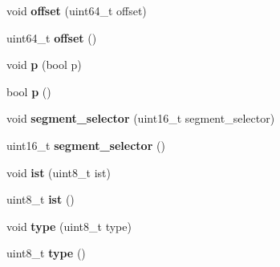 \begin{DoxyCompactItemize}
\item 
\hypertarget{classintel64__idt__entry_a64d4c35b617950088c2abad303904d0e}{}void {\bfseries offset} (uint64\+\_\+t offset)\label{classintel64__idt__entry_a64d4c35b617950088c2abad303904d0e}

\item 
\hypertarget{classintel64__idt__entry_afb87c81dc48ca3181df4e3cc02060582}{}uint64\+\_\+t {\bfseries offset} ()\label{classintel64__idt__entry_afb87c81dc48ca3181df4e3cc02060582}

\item 
\hypertarget{classintel64__idt__entry_a4ac5fe1536073c47a1f6250c8e3c76dc}{}void {\bfseries p} (bool p)\label{classintel64__idt__entry_a4ac5fe1536073c47a1f6250c8e3c76dc}

\item 
\hypertarget{classintel64__idt__entry_af1667a52578cedb9579e275dfa99e99b}{}bool {\bfseries p} ()\label{classintel64__idt__entry_af1667a52578cedb9579e275dfa99e99b}

\item 
\hypertarget{classintel64__idt__entry_ac0d1aa71414d543e8df0e2bdcfffe82e}{}void {\bfseries segment\+\_\+selector} (uint16\+\_\+t segment\+\_\+selector)\label{classintel64__idt__entry_ac0d1aa71414d543e8df0e2bdcfffe82e}

\item 
\hypertarget{classintel64__idt__entry_a979a444a42eae4301d1f777612061b96}{}uint16\+\_\+t {\bfseries segment\+\_\+selector} ()\label{classintel64__idt__entry_a979a444a42eae4301d1f777612061b96}

\item 
\hypertarget{classintel64__idt__entry_a56433b6db1cb3663419d655e47961eb9}{}void {\bfseries ist} (uint8\+\_\+t ist)\label{classintel64__idt__entry_a56433b6db1cb3663419d655e47961eb9}

\item 
\hypertarget{classintel64__idt__entry_a4325dfbf088793245d29110dd5ca7c34}{}uint8\+\_\+t {\bfseries ist} ()\label{classintel64__idt__entry_a4325dfbf088793245d29110dd5ca7c34}

\item 
\hypertarget{classintel64__idt__entry_afaf8e021378b23f17a2f15eebccef7f5}{}void {\bfseries type} (uint8\+\_\+t type)\label{classintel64__idt__entry_afaf8e021378b23f17a2f15eebccef7f5}

\item 
\hypertarget{classintel64__idt__entry_a03ddcf177598b2d47d499a3199fee9a8}{}uint8\+\_\+t {\bfseries type} ()\label{classintel64__idt__entry_a03ddcf177598b2d47d499a3199fee9a8}


\end{DoxyCompactItemize}
